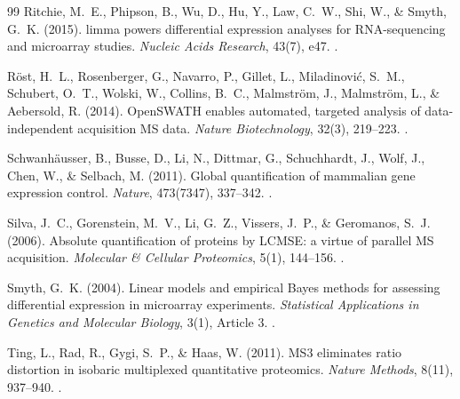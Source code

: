\documentclass[11pt,oneside]{book}
\begin{document}
\begin{thebibliography}{99}
Ritchie, M.~E., Phipson, B., Wu, D., Hu, Y., Law, C.~W., Shi, W., \& Smyth, G.~K. (2015). limma powers differential expression analyses for RNA-sequencing and microarray studies. \textit{Nucleic Acids Research}, 43(7), e47. .

R{\"o}st, H.~L., Rosenberger, G., Navarro, P., Gillet, L., Miladinovi{\'c}, S.~M., Schubert, O.~T., Wolski, W., Collins, B.~C., Malmstr{\"o}m, J., Malmstr{\"o}m, L., \& Aebersold, R. (2014). OpenSWATH enables automated, targeted analysis of data-independent acquisition MS data. \textit{Nature Biotechnology}, 32(3), 219--223. .

Schwanh{\"a}usser, B., Busse, D., Li, N., Dittmar, G., Schuchhardt, J., Wolf, J., Chen, W., \& Selbach, M. (2011). Global quantification of mammalian gene expression control. \textit{Nature}, 473(7347), 337--342. .

Silva, J.~C., Gorenstein, M.~V., Li, G.~Z., Vissers, J.~P., \& Geromanos, S.~J. (2006). Absolute quantification of proteins by LCMSE: a virtue of parallel MS acquisition. \textit{Molecular \& Cellular Proteomics}, 5(1), 144--156. .

Smyth, G.~K. (2004). Linear models and empirical Bayes methods for assessing differential expression in microarray experiments. \textit{Statistical Applications in Genetics and Molecular Biology}, 3(1), Article 3. .

Ting, L., Rad, R., Gygi, S.~P., \& Haas, W. (2011). MS3 eliminates ratio distortion in isobaric multiplexed quantitative proteomics. \textit{Nature Methods}, 8(11), 937--940. .

\end{thebibliography}
\end{document}
